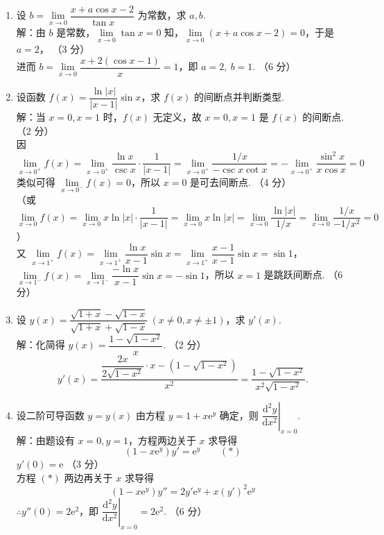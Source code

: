 \documentclass[a4paper,11pt]{ctexart}
\newcommand{\e}{\mathrm{e}}
\newcommand{\dd}{\mathrm{d}}
\newcommand{\score}[1]{\hfill（#1）}
\begin{document}
\begin{enumerate}[label=\arabic*., leftmargin=2em, itemsep=1.0em, topsep=0.5em]
  \item 设 $b = \lim\limits_{x\to 0}\dfrac{x + a\cos x - 2}{\tan x}$ 为常数，求 $a, b$.\\[0.3em]
  解：由 $b$ 是常数，$\lim\limits_{x\to 0}\tan x = 0$ 知，$\lim\limits_{x\to 0}(x + a\cos x - 2) = 0$，于是 $a = 2$， \score{3 分}\\[0.2em]
  进而 $b = \lim\limits_{x\to 0}\dfrac{x + 2(\cos x - 1)}{x} = 1$，即 $a = 2,\ b = 1$. \score{6 分}

  \item 设函数 $f(x) = \dfrac{\ln|x|}{|x-1|}\sin x$，求 $f(x)$ 的间断点并判断类型.\\[0.3em]
  解：当 $x = 0, x = 1$ 时，$f(x)$ 无定义，故 $x = 0, x = 1$ 是 $f(x)$ 的间断点. \score{2 分}\\[0.2em]
  因 $\lim\limits_{x\to 0^+} f(x) = \lim\limits_{x\to 0^+}\dfrac{\ln x}{\csc x}\cdot\dfrac{1}{|x-1|} = \lim\limits_{x\to 0^+}\dfrac{1/x}{-\csc x\cot x} = -\lim\limits_{x\to 0^+}\dfrac{\sin^2 x}{x\cos x} = 0$\\[0.2em]
  类似可得 $\lim\limits_{x\to 0^-} f(x) = 0$，所以 $x = 0$ 是可去间断点. \score{4 分}\\[0.2em]
  （或 $\lim\limits_{x\to 0} f(x) = \lim\limits_{x\to 0} x\ln|x|\cdot\dfrac{1}{|x-1|} = \lim\limits_{x\to 0} x\ln|x| = \lim\limits_{x\to 0}\dfrac{\ln|x|}{1/x} = \lim\limits_{x\to 0}\dfrac{1/x}{-1/x^2} = 0$）\\[0.3em]
  又 $\lim\limits_{x\to 1^+} f(x) = \lim\limits_{x\to 1^+}\dfrac{\ln x}{x-1}\sin x = \lim\limits_{x\to 1^+}\dfrac{x-1}{x-1}\sin x = \sin 1$，\\[0.2em]
  $\lim\limits_{x\to 1^-} f(x) = \lim\limits_{x\to 1^-}\dfrac{-\ln x}{x-1}\sin x = -\sin 1$，所以 $x = 1$ 是跳跃间断点. \score{6 分}

  \item 设 $y(x) = \dfrac{\sqrt{1+x} - \sqrt{1-x}}{\sqrt{1+x} + \sqrt{1-x}}~(x\neq 0, x\neq\pm 1)$，求 $y'(x)$.\\[0.3em]
  解：化简得 $y(x) = \dfrac{1 - \sqrt{1-x^2}}{x}$. \score{2 分}
  \[
    y'(x) = \frac{\dfrac{2x}{2\sqrt{1-x^2}}\cdot x - \left(1 - \sqrt{1-x^2}\right)}{x^2} = \frac{1 - \sqrt{1-x^2}}{x^2\sqrt{1-x^2}}. \tag*{（6 分）}
  \]

  \item 设二阶可导函数 $y = y(x)$ 由方程 $y = 1 + x\e^y$ 确定，则 $\left.\dfrac{\dd^2 y}{\dd x^2}\right|_{x=0}$.\\[0.3em]
  解：由题设有 $x = 0, y = 1$，方程两边关于 $x$ 求导得
  \[
    (1 - x\e^y)y' = \e^y \qquad (*)
  \]
  $y'(0) = \e$ \score{3 分}\\[0.2em]
  方程 $(*)$ 两边再关于 $x$ 求导得
  \[
    (1 - x\e^y)y'' = 2y'\e^y + x(y')^2\e^y \tag*{（5 分）}
  \]
  $\therefore y''(0) = 2\e^2$，即 $\left.\dfrac{\dd^2 y}{\dd x^2}\right|_{x=0} = 2\e^2$. \score{6 分}


\end{enumerate}
\end{document}
